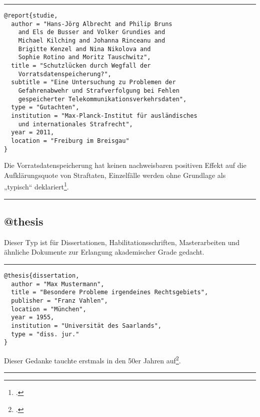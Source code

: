 \documentclass[11pt,a4paper,DIV=calc]{scrartcl}
\newenvironment{rubexample}{\par\vspace{\baselineskip}\hrule\par\begin{refsection}}{\end{refsection}\par\hrule\par\vspace{\baselineskip}}
\begin{document}
\begin{rubexample}
\begin{verbatim}
@report{studie,
  author = "Hans-Jörg Albrecht and Philip Bruns
    and Els de Busser and Volker Grundies and
    Michael Kilching and Johanna Rinceanu and
    Brigitte Kenzel and Nina Nikolova and
    Sophie Rotino and Moritz Tauschwitz",
  title = "Schutzlücken durch Wegfall der
    Vorratsdatenspeicherung?",
  subtitle = "Eine Untersuchung zu Problemen der
    Gefahrenabwehr und Strafverfolgung bei Fehlen
    gespeicherter Telekommunikationsverkehrsdaten",
  type = "Gutachten",
  institution = "Max-Planck-Institut für ausländisches
    und internationales Strafrecht",
  year = 2011,
  location = "Freiburg im Breisgau"
}
\end{verbatim}

Die Vorratsdatenspeicherung hat keinen nachweisbaren positiven Effekt
auf die Aufklärungsquote von Straftaten, Einzelfälle werden ohne
Grundlage als „typisch“ deklariert\footcite[218f.]{studie}.

\printbibliography
\end{rubexample}

\subsection{@thesis}

Dieser Typ ist für Dissertationen, Habilitationsschriften,
Masterarbeiten und ähnliche Dokumente zur Erlangung akademischer
Grade gedacht.

\begin{rubexample}
\begin{verbatim}
@thesis{dissertation,
  author = "Max Mustermann",
  title = "Besondere Probleme irgendeines Rechtsgebiets",
  publisher = "Franz Vahlen",
  location = "München",
  year = 1955,
  institution = "Universität des Saarlands",
  type = "diss. jur."
}
\end{verbatim}

Dieser Gedanke tauchte erstmals in den 50er Jahren
auf\footcite[123]{dissertation}.

\printbibliography
\end{rubexample}
\end{document}
